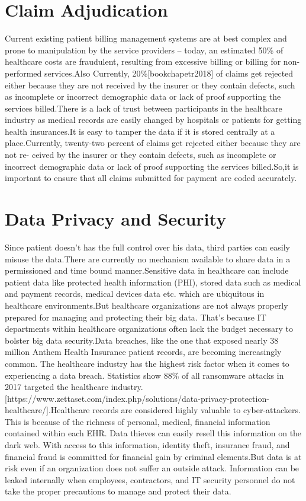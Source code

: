 \documentclass[12pt]{report}
\begin{document}
\section{Claim Adjudication}
Current existing patient billing management systems are at best complex and prone to manipulation by the
service providers – today, an estimated 50\% of healthcare costs are fraudulent, resulting from excessive
billing or billing for non-performed services.Also Currently, 20\%[bookchapetr2018] of claims get rejected either because they are not received by the insurer or they contain defects, such as incomplete or incorrect demographic
data or lack of proof supporting the services billed.There is a lack of trust between participants in the healthcare industry as medical records are easily changed by hospitals or patients for getting health insurances.It is easy to tamper the data if it is stored centrally at a place.Currently, twenty-two percent of claims get rejected either because they are not re-
ceived by the insurer or they contain defects, such as incomplete or incorrect demographic
data or lack of proof supporting the services billed.So,it is important to ensure that all
claims submitted for payment are coded accurately.
\section{Data Privacy and Security}
Since patient doesn't has the full control over his data, third parties can easily misuse the data.There are currently no mechanism available to share data in a permissioned and time bound manner.Sensitive data in healthcare can include patient data like protected health information (PHI), stored data such as medical and payment records, medical devices data etc. which are ubiquitous in healthcare environments.But healthcare organizations are not always properly prepared for managing and protecting their big data. That’s because IT departments within healthcare organizations often lack the budget necessary to bolster big data security.Data breaches, like the one that exposed nearly 38 million Anthem Health Insurance patient records, are becoming increasingly common. The healthcare industry has the highest risk factor when it comes to experiencing a data breach. Statistics show 88\% of all ransomware attacks in 2017 targeted the healthcare industry.[https://www.zettaset.com/index.php/solutions/data-privacy-protection-healthcare/].Healthcare records are considered highly valuable to cyber-attackers. This is because of the richness of personal, medical, financial information contained within each EHR. Data thieves can easily resell this information on the dark web. With access to this information, identity theft, insurance fraud, and financial fraud is committed for financial gain by criminal elements.But data is at risk even if an organization does not suffer an outside attack. Information can be leaked internally when employees, contractors, and IT security personnel do not take the proper precautions to manage and protect their data.
\end{document}
